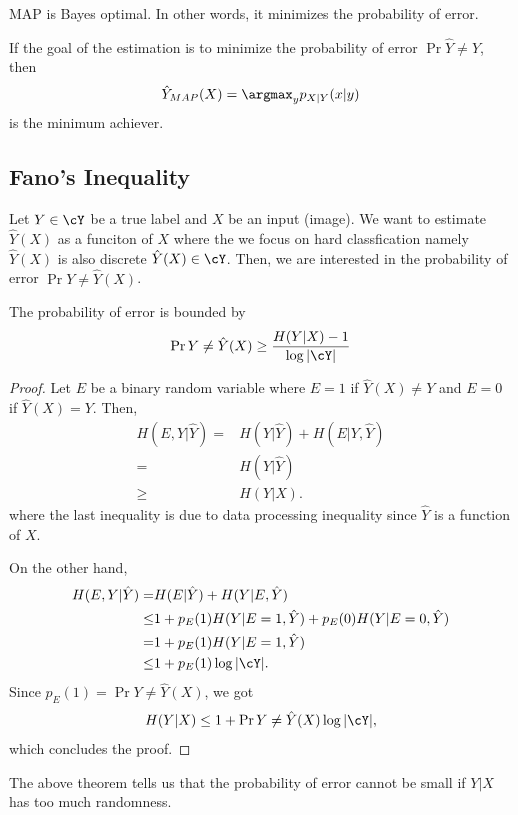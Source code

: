 \documentclass{article}
\begin{document}
\begin{theorem}
    MAP is Bayes optimal. In other words, it minimizes the probability of error.
\end{theorem}
If the goal of the estimation is to minimize the probability of error $\Pr{\hat{Y}\neq Y}$, then
\begin{align}
    \hat{Y}_{MAP}(X) =  \argmax_y p_{X|Y}(x|y)
\end{align}
is the minimum achiever.

\subsection{Fano's Inequality}
Let $Y\in\cY$ be a true label and $X$ be an input (image).
We want to estimate $\hat{Y}(X)$ as a funciton of $X$
where the we focus on hard classfication namely $\hat{Y}(X)$ is also discrete $\hat{Y}(X)\in\cY$.
Then, we are interested in the probability of error $\Pr{Y\neq \hat{Y}(X)}$.

\begin{theorem}
The probability of error is bounded by
\begin{align}
    \Pr{Y\neq \hat{Y}(X)} \geq \frac{H(Y|X)-1}{\log | \cY |}
    \end{align}
\end{theorem}
\begin{proof}
    Let $E$ be a binary random variable where $E=1$ if $\hat{Y}(X)\neq Y$ and $E=0$ if $\hat{Y}(X) = Y$.
    Then,
    \begin{align}
        H(E, Y|\hat{Y}) =& H(Y|\hat{Y}) + H(E|Y, \hat{Y})\\
        =& H(Y|\hat{Y})\\
        \geq& H(Y|X).
    \end{align}
    where the last inequality is due to data processing inequality since $\hat{Y}$ is a function of $X$.

    On the other hand,
    \begin{align}
        H(E, Y|\hat{Y}) =& H(E|\hat{Y}) + H(Y|E, \hat{Y})\\
        \leq& 1 + p_E(1) H(Y|E=1, \hat{Y}) + p_E(0) H(Y|E=0, \hat{Y})\\
        =& 1 + p_E(1) H(Y|E=1, \hat{Y})\\
        \leq& 1 + p_E(1) \log |\cY|.
    \end{align}
    Since $p_E(1) = \Pr{Y\neq \hat{Y}(X)}$, we got
    \begin{align}
        H(Y|X) \leq 1 + \Pr{Y\neq\hat{Y}(X)} \log |\cY|,
    \end{align}
    which concludes the proof. 
    \end{proof}
    The above theorem tells us that the probability of error cannot be small if $Y|X$ has too much randomness.
\end{document}
